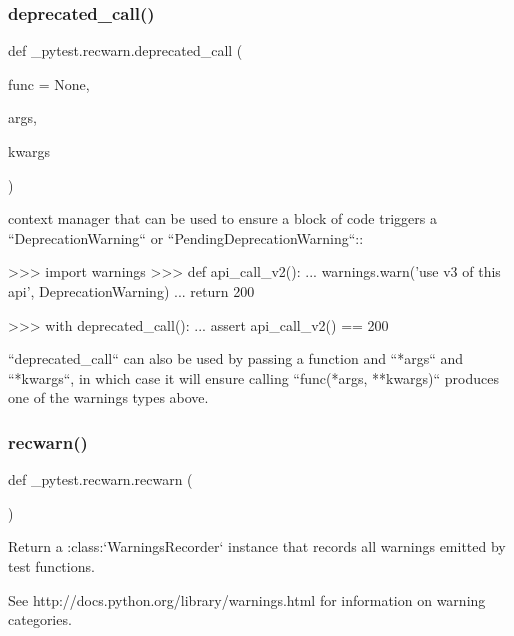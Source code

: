 \subsubsection{\texorpdfstring{deprecated\+\_\+call()}{deprecated\_call()}}
{\footnotesize\ttfamily def \+\_\+pytest.\+recwarn.\+deprecated\+\_\+call (\begin{DoxyParamCaption}\item[{}]{func = {\ttfamily None},  }\item[{}]{args,  }\item[{}]{kwargs }\end{DoxyParamCaption})}

\begin{DoxyVerb}context manager that can be used to ensure a block of code triggers a
``DeprecationWarning`` or ``PendingDeprecationWarning``::

    >>> import warnings
    >>> def api_call_v2():
    ...     warnings.warn('use v3 of this api', DeprecationWarning)
    ...     return 200

    >>> with deprecated_call():
    ...    assert api_call_v2() == 200

``deprecated_call`` can also be used by passing a function and ``*args`` and ``*kwargs``,
in which case it will ensure calling ``func(*args, **kwargs)`` produces one of the warnings
types above.
\end{DoxyVerb}
 \mbox{\label{namespace__pytest_1_1recwarn_acb43770689a1e4cce8a34dfb8378d806}} 
\subsubsection{\texorpdfstring{recwarn()}{recwarn()}}
{\footnotesize\ttfamily def \+\_\+pytest.\+recwarn.\+recwarn (\begin{DoxyParamCaption}{ }\end{DoxyParamCaption})}

\begin{DoxyVerb}Return a :class:`WarningsRecorder` instance that records all warnings emitted by test functions.

See http://docs.python.org/library/warnings.html for information
on warning categories.
\end{DoxyVerb}
 \mbox{\label{namespace__pytest_1_1recwarn_a50538fa73c5c292ebad07a9c936c7b53}} 
